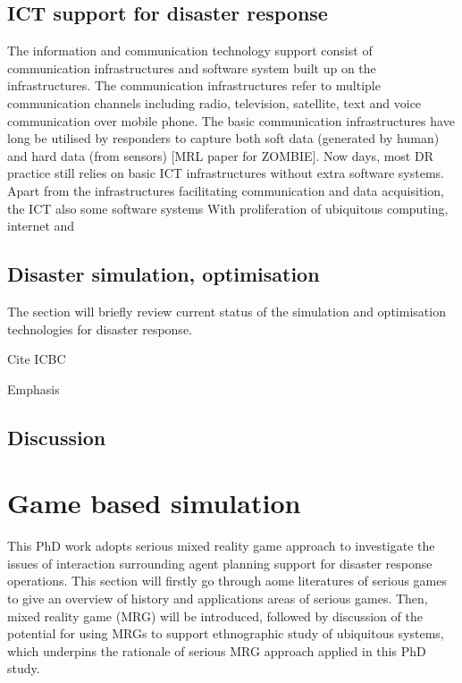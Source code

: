 \subsection{ICT support for disaster response}
The information and communication technology support consist of communication infrastructures and software system built up on the infrastructures. The communication infrastructures refer to multiple communication channels including radio, television, satellite, text and voice communication over mobile phone. The basic communication infrastructures have long be utilised by responders to capture both soft data (generated by human) and hard data (from sensors) [MRL paper for ZOMBIE]. Now days, most DR practice still relies on basic ICT infrastructures without extra software systems. \\

Apart from the infrastructures facilitating communication and data acquisition, the ICT also some software systems   With proliferation of ubiquitous computing, internet and \\


\subsection{Disaster simulation, optimisation}
The section will briefly review current status of the simulation and optimisation technologies for disaster response.

Cite ICBC

Emphasis

\subsection{Discussion}


\section{Game based simulation} \label{sec:LRMRgame}
This PhD work adopts serious mixed reality game approach to investigate the issues of interaction surrounding agent planning support for disaster response operations. This section will firstly go through aome literatures of serious games to give an overview of history and applications areas of serious games. Then, mixed reality game (MRG) will be introduced, followed by discussion of the potential for using MRGs to support ethnographic study of ubiquitous systems, which underpins the rationale of serious MRG approach applied in this PhD study.\\ 



